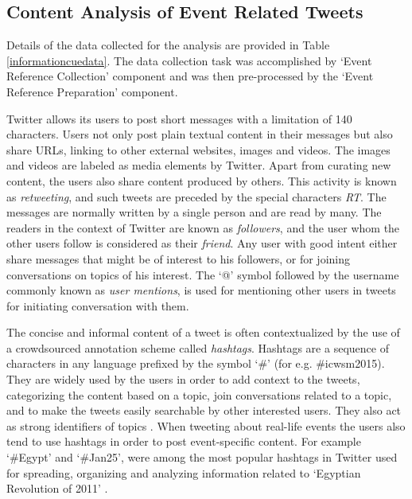 \subsection{Content Analysis of Event Related Tweets}
Details of the data collected for the analysis are provided in Table \ref{informationcuedata}. The data collection task was accomplished by `Event Reference Collection' component and was then pre-processed by the `Event Reference Preparation' component.

Twitter allows its users to post short messages with a limitation of 140 characters. Users not only post plain textual content in their messages but also share URLs, linking to other external websites, images and videos. The images and videos are 
labeled as media elements by Twitter. Apart from curating new content, the users also share content produced by others. This activity is known as \textit{retweeting}, and such tweets are preceded by the special characters \textit{RT}.
The messages are normally written by a single person and are read by many. The readers in the context of Twitter are known as \textit{followers}, and the user whom the other users follow is considered as their \textit{friend}. Any user with good intent either share messages 
that might be of interest to his followers, or for joining conversations on topics of his interest. The `@' symbol followed by the username commonly known as \textit{user mentions}, is used for mentioning other users in tweets for initiating conversation with them. 

The concise and informal content of a tweet is often contextualized by the use of a crowdsourced annotation scheme called \textit{hashtags}. Hashtags are a sequence of characters in any language prefixed by the symbol `\#' (for e.g. \#icwsm2015). They are widely used
by the users in order to add context to the tweets, categorizing the content based on a topic, join conversations related to a topic, and to make the tweets easily searchable by other interested users. They also act as strong identifiers of topics \cite{laniado2010making}. When tweeting about real-life
events the users also tend to use hashtags in order to post event-specific content. For example `\#Egypt' and `\#Jan25', were among the most popular hashtags in Twitter used for spreading, organizing and analyzing information related to `Egyptian Revolution of 2011' \cite{barrons2012suleiman}. 

